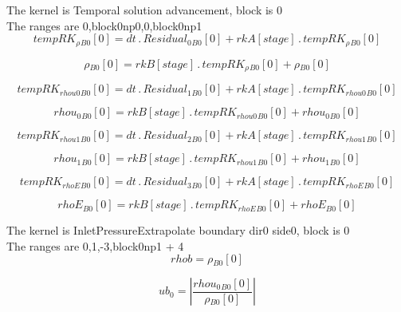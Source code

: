 \documentclass{article}
\begin{document}
\noindent The kernel is Temporal solution advancement, block is 0\\\noindent The ranges are 0,block0np0,0,block0np1\\\begin{dmath}{tempRK_{\rho}{_{B0}}}[{0}] = dt \,.\, {Residual_{0}{_{B0}}}[{0}] + {rkA}[{stage}] \,.\, {tempRK_{\rho}{_{B0}}}[{0}]\end{dmath}

\begin{dmath}{\rho{_{B0}}}[{0}] = {rkB}[{stage}] \,.\, {tempRK_{\rho}{_{B0}}}[{0}] + {\rho{_{B0}}}[{0}]\end{dmath}

\begin{dmath}{tempRK_{rhou0}{_{B0}}}[{0}] = dt \,.\, {Residual_{1}{_{B0}}}[{0}] + {rkA}[{stage}] \,.\, {tempRK_{rhou0}{_{B0}}}[{0}]\end{dmath}

\begin{dmath}{rhou_{0}{_{B0}}}[{0}] = {rkB}[{stage}] \,.\, {tempRK_{rhou0}{_{B0}}}[{0}] + {rhou_{0}{_{B0}}}[{0}]\end{dmath}

\begin{dmath}{tempRK_{rhou1}{_{B0}}}[{0}] = dt \,.\, {Residual_{2}{_{B0}}}[{0}] + {rkA}[{stage}] \,.\, {tempRK_{rhou1}{_{B0}}}[{0}]\end{dmath}

\begin{dmath}{rhou_{1}{_{B0}}}[{0}] = {rkB}[{stage}] \,.\, {tempRK_{rhou1}{_{B0}}}[{0}] + {rhou_{1}{_{B0}}}[{0}]\end{dmath}

\begin{dmath}{tempRK_{rhoE}{_{B0}}}[{0}] = dt \,.\, {Residual_{3}{_{B0}}}[{0}] + {rkA}[{stage}] \,.\, {tempRK_{rhoE}{_{B0}}}[{0}]\end{dmath}

\begin{dmath}{rhoE{_{B0}}}[{0}] = {rkB}[{stage}] \,.\, {tempRK_{rhoE}{_{B0}}}[{0}] + {rhoE{_{B0}}}[{0}]\end{dmath}

\noindent The kernel is InletPressureExtrapolate boundary dir0 side0, block is 0\\\noindent The ranges are 0,1,-3,block0np1 + 4\\\begin{dmath}rhob = {\rho{_{B0}}}[{0}]\end{dmath}

\begin{dmath}ub_{0} = \left|{\frac{{rhou_{0}{_{B0}}}[{0}]}{{\rho{_{B0}}}[{0}]}}\right|\end{dmath}
\end{document}
